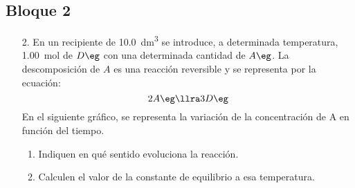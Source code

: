 \documentclass[../Práctica.root.tex]{subfiles}
\begin{document}
\subsection{Bloque 2}
\begin{enumerate}
    \item[2.] En un recipiente de \SI{10,0}{\dm\cubed} se introduce, a determinada temperatura, \SI{1,00}{\mole} de $D \eg$
          con una determinada cantidad de $A \eg$. La descomposición de $A$ es una reacción reversible
          y se representa por la ecuación:
          \[ 2 A \eg \llra 3 D \eg \]
          En el siguiente gráfico, se representa la variación de la concentración de A en función del
          tiempo.
          \begin{enumerate}
              \item Indiquen en qué sentido evoluciona la reacción.
              \item Calculen el valor de la constante de equilibrio a esa temperatura.
          \end{enumerate}
          \begin{figure}[h]
              \centering
          \end{figure}


\end{enumerate}
\end{document}
